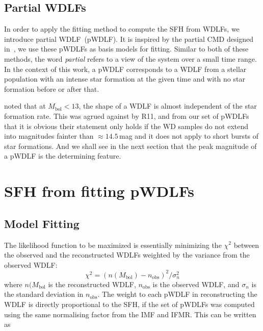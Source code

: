 \documentclass[fleqn,usenatbib]{mnras}
\begin{document}
\subsection{Partial WDLFs}
In order to apply the fitting method to compute the SFH from WDLFs, we introduce
partial WDLF~(pWDLF). It is inspired by the partial CMD designed
in~\citep{2006A&A...459..783C}, we use these pWDLFs as basis models
for fitting. Similar to both of these methods, the word \textit{partial} 
refers to a view of the system over a small time range. In the context of this
work, a pWDLF corresponds to a WDLF from a stellar population with an intense
star formation at the given time and with no star formation before or after
that.

\citet{2008ApJ...682L.109I} noted that at $M_{\mathrm{bol}} < 13$, the shape of
a WDLF is almost independent of the star formation rate. This was agrued
against by R11, and from our set of pWDLFs that it is obvious their statement
only holds if the WD samples do not extend into magnitudes fainter than
$\approx14.5$\,mag and it does not apply to short bursts of star formations.
And we shall see in the next section that the peak magnitude of a pWDLF is the
determining feature.

\section{SFH from fitting pWDLFs}

\subsection{Model Fitting}
\label{sec:model_fitting}
The likelihood function to be maximized is essentially minimizing the $\chi^2$
between the observed and the reconstructed WDLFs weighted by the variance from
the observed WDLF:
\begin{equation}
\chi^2 = \left(n(M_\mathrm{bol}) - n_\mathrm{obs}\right)^2 / \sigma_n^2
\end{equation}
where $n(M_\mathrm{bol}$ is the reconstructed WDLF, $n_\mathrm{obs}$ is the
observed WDLF, and $\sigma_n$ is the standard deviation in $n_\mathrm{obs}$.
The weight to each pWDLF in reconstructing the WDLF is directly proportional to
the SFH, if the set of pWDLFs was computed using the same normalising factor
from the IMF and IFMR. This can be written as
\end{document}
